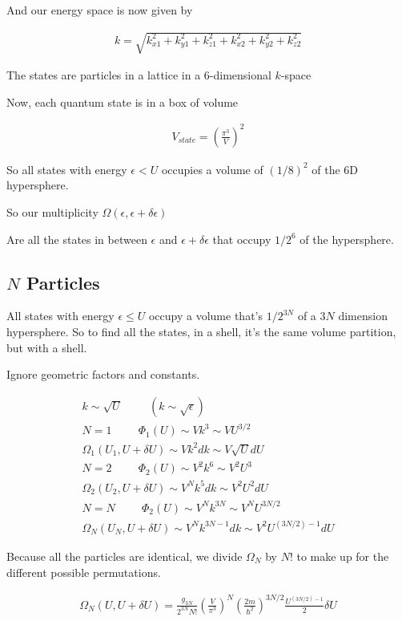 \documentclass[fleqn]{report}
\newcommand{\hp}{\hspace{1cm}}
\newcommand{\equations} [1] {
\begin{gather*}
#1
\end{gather*}
}
\begin{document}
And our energy space is now given by 

\equations{
    k 
    =
    \sqrt{
        k_{x1}^2
        +
        k_{y1}^2
        +
        k_{z1}^2
        +
        k_{x2}^2
        +
        k_{y2}^2
        +
        k_{z2}^2
    }
}

The states are particles in a lattice in a 6-dimensional $k$-space

Now, each quantum state is in a box of volume 
\equations{
    V_{state}
    =
    \left(
        \frac{\pi^3}{V}
    \right)^2
}

So all states with energy $\epsilon < U$ occupies a volume of 
$\left( 1/8 \right)^2$ of the 6D hypersphere.

So our multiplicity 
$
    \Omega(\epsilon, \epsilon + \delta \epsilon)
$

Are all the states in between $\epsilon$ and $\epsilon + \delta \epsilon$ 
that occupy $1/2^6$ of the hypersphere.

\subsection{$N$ Particles}
All states with energy $\epsilon \leq U$ occupy a volume that's 
$1/2^{3N}$ of a $3N$ dimension hypersphere. So to find all the states, 
in a shell, it's the same volume partition, but with a shell. 

Ignore geometric factors and constants.
\equations{
    k \sim \sqrt{U} 
    \hp 
    (k \sim \sqrt{\epsilon} )
    \\
    N = 1 
    \hp 
    \Phi_1(U)
    \sim 
    V k^3 
    \sim 
    V U^{3/2}
    \\
    \Omega_1(U_1, U + \delta U)
    \sim 
    V k^2 dk 
    \sim 
    V \sqrt{U} dU 
    \\
    N = 2
    \hp 
    \Phi_2(U)
    \sim 
    V^2 k^6
    \sim 
    V^2 U^{3}
    \\
    \Omega_2(U_2, U + \delta U)
    \sim 
    V^N k^5 dk 
    \sim 
    V^2 U^2 dU 
    \\
    N = N
    \hp 
    \Phi_2(U)
    \sim 
    V^N k^{3N}
    \sim 
    V^N U^{3N / 2}
    \\
    \Omega_N(U_N, U + \delta U)
    \sim 
    V^N k^{3N - 1} dk 
    \sim 
    V^2 U^{(3N/2)-1} dU 
}

Because all the particles are identical, we 
divide $\Omega_N$ by $N!$ to make up for the different possible 
permutations.

\equations{
    \Omega_N(U, U + \delta U)
    =
    \frac{g_{3N}}{2^{3N} N!}
    \left(
        \frac{V}{\pi^3}
    \right)^N 
    \left(
        \frac{2m}{\hbar^2}
    \right)^{3N/2} 
    \frac{U^{(3N/2) - 1}}{2} 
    \delta U
}
\end{document}
